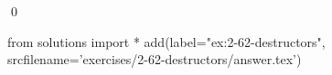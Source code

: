
\begin{ex}
  \label{ex:2-62-destructors}
  
  \qed
\end{ex}
\begin{python0}
from solutions import *
add(label="ex:2-62-destructors",
    srcfilename='exercises/2-62-destructors/answer.tex')
\end{python0}
